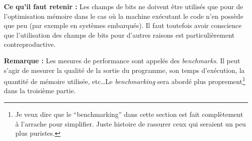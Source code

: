 \documentclass[../../../main.tex]{subfiles}
\begin{document}
\textbf{Ce qu'il faut retenir :} Les champs de bits ne doivent être utilisés que pour de l'optimisation mémoire dans le cas où la machine exécutant le code n'en possède que peu (par exemple en systèmes embarqués). Il faut toutefois avoir conscience que l'utilisation des champs de bits pour d'autres raisons est particulièrement contreproductive.

\textbf{Remarque :} Les mesures de performance sont appelés des \textit{benchmarks}. Il peut s'agir de mesurer la qualité de la sortie du programme, son temps d'exécution, la quantité de mémoire utilisée, etc\dots Le \textit{benchmarking} sera abordé plus proprement\footnote{Je veux dire que le ``benchmarking'' dans cette section est fait complètement à l'arrache pour simplifier. Juste histoire de rassurer ceux qui seraient un peu plus puristes.} dans la troisième partie.
\end{document}
